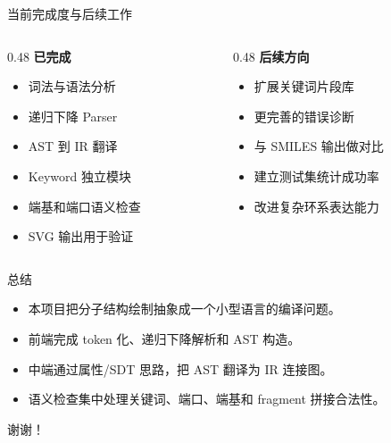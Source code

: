 \documentclass{beamer}
\begin{document}
\begin{frame}{当前完成度与后续工作}
    \begin{columns}
        \begin{column}{0.48\textwidth}
            \textbf{已完成}
            \begin{itemize}
                \item 词法与语法分析
                \item 递归下降 Parser
                \item AST 到 IR 翻译
                \item Keyword 独立模块
                \item 端基和端口语义检查
                \item SVG 输出用于验证
            \end{itemize}
        \end{column}
        \begin{column}{0.48\textwidth}
            \textbf{后续方向}
            \begin{itemize}
                \item 扩展关键词片段库
                \item 更完善的错误诊断
                \item 与 SMILES 输出做对比
                \item 建立测试集统计成功率
                \item 改进复杂环系表达能力
            \end{itemize}
        \end{column}
    \end{columns}
\end{frame}

\begin{frame}{总结}
    \begin{itemize}
        \item 本项目把分子结构绘制抽象成一个小型语言的编译问题。
        \item 前端完成 token 化、递归下降解析和 AST 构造。
        \item 中端通过属性/SDT 思路，把 AST 翻译为 IR 连接图。
        \item 语义检查集中处理关键词、端口、端基和 fragment 拼接合法性。
    \end{itemize}

    \vspace{0.8em}
    \centering
    \Large{谢谢！}
\end{frame}
\end{document}
